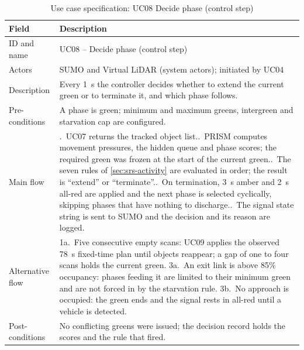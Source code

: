 \begin{table}[htbp]
\centering
\caption{Use case specification: UC08 Decide phase (control step)}
\label{tab:srs-uc-decide}
\small
\renewcommand{\arraystretch}{1.15}
\begin{tabularx}{\textwidth}{@{}>{\raggedright\arraybackslash}p{2.8cm}>{\raggedright\arraybackslash}X@{}}
\toprule
\textbf{Field} & \textbf{Description}\\
\midrule
ID and name & UC08 -- Decide phase (control step)\\
Actors & SUMO and Virtual LiDAR (system actors); initiated by UC04\\
Description & Every 1~s the controller decides whether to extend the current green or to terminate it, and which phase follows.\\
Pre-conditions & A phase is green; minimum and maximum greens, intergreen and starvation cap are configured.\\
Main flow & 1.~UC07 returns the tracked object list.\newline
2.~PRISM computes movement pressures, the hidden queue and phase scores; the required green was frozen at the start of the current green.\newline
3.~The seven rules of \cref{sec:srs-activity} are evaluated in order; the result is ``extend'' or ``terminate''.\newline
4.~On termination, 3~s amber and 2~s all-red are applied and the next phase is selected cyclically, skipping phases that have nothing to discharge.\newline
5.~The signal state string is sent to SUMO and the decision and its reason are logged.\\
Alternative flow & 1a.~Five consecutive empty scans: UC09 applies the observed 78~s fixed-time plan until objects reappear; a gap of one to four scans holds the current green.\newline
3a.~An exit link is above 85\% occupancy: phases feeding it are limited to their minimum green and are not forced in by the starvation rule.\newline
3b.~No approach is occupied: the green ends and the signal rests in all-red until a vehicle is detected.\\
Post-conditions & No conflicting greens were issued; the decision record holds the scores and the rule that fired.\\
\bottomrule
\end{tabularx}
\end{table}

